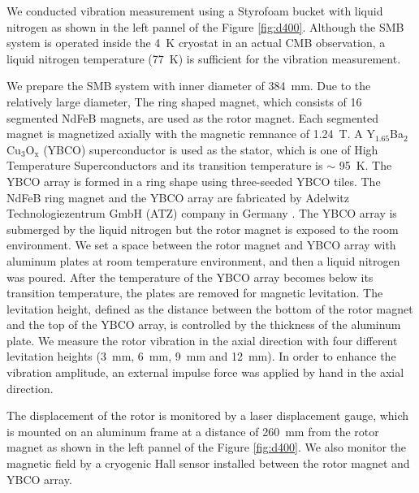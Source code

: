 \documentclass[a4paper]{jpconf}
\begin{document}
We conducted vibration measurement using a Styrofoam bucket with liquid nitrogen as shown in the left pannel of the Figure \ref{fig:d400}.
Although the SMB system is operated inside the 4~K cryostat in an actual CMB observation, a liquid nitrogen temperature (77~K) is sufficient for the vibration measurement.

We prepare the SMB system with inner diameter of 384~mm.
Due to the relatively large diameter, The ring shaped magnet, which consists of 16 segmented NdFeB magnets, are used as the rotor magnet.
Each segmented magnet is magnetized axially with the magnetic remnance of 1.24~T.
A Y$_{1.65}$Ba$_{2}$Cu$_{3}$O$_{\mathrm{x}}$ (YBCO) superconductor is used as the stator, which is one of High Temperature Superconductors and its transition temperature is $\sim$ 95~K.
The YBCO array is formed in a ring shape using three-seeded YBCO tiles.
The NdFeB ring magnet and the YBCO array are fabricated by Adelwitz Technologiezentrum GmbH (ATZ) company in Germany \cite{ATZ}.
The YBCO array is submerged by the liquid nitrogen but the rotor magnet is exposed to the room environment.
We set a space between the rotor magnet and YBCO array with aluminum plates at room temperature environment, and then a liquid nitrogen was poured.
After the temperature of the YBCO array becomes below its transition temperature, the plates are removed for magnetic levitation.
The levitation height, defined as the distance between the bottom of the rotor magnet and the top of the YBCO array, is controlled by the thickness of the aluminum plate.
We measure the rotor vibration in the axial direction with four different levitation heights (3~mm, 6~mm, 9~mm and 12~mm).
In order to enhance the vibration amplitude, an external impulse force was applied by hand in the axial direction.

The displacement of the rotor is monitored by a laser displacement gauge,
which is mounted on an aluminum frame at a distance of 260~mm from the rotor magnet as shown in the left pannel of the Figure \ref{fig:d400}.
We also monitor the magnetic field by a cryogenic Hall sensor installed between the rotor magnet and YBCO array.
\end{document}
